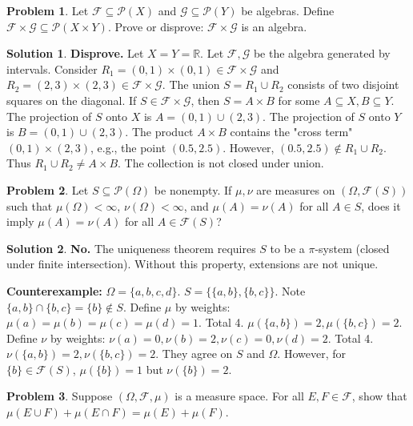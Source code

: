\documentclass[11pt]{article}
\theoremstyle{definition}
\newtheorem{problem}{Problem}
\newtheorem*{solution}{Solution}
\newcommand{\R}{\mathbb{R}}
\newcommand{\F}{\mathcal{F}}
\newcommand{\G}{\mathcal{G}}
\newcommand{\Pset}{\mathcal{P}}
\begin{document}
\hrulefill

\begin{problem}
Let $\F \subseteq \Pset(X)$ and $\G \subseteq \Pset(Y)$ be algebras. Define $\F \times \G \subseteq \Pset(X \times Y)$. Prove or disprove: $\F \times \G$ is an algebra.
\end{problem}

\begin{solution}
\textbf{Disprove.}
Let $X = Y = \R$. Let $\F, \G$ be the algebra generated by intervals.
Consider $R_1 = (0, 1) \times (0, 1) \in \F \times \G$ and $R_2 = (2, 3) \times (2, 3) \in \F \times \G$.
The union $S = R_1 \cup R_2$ consists of two disjoint squares on the diagonal.
If $S \in \F \times \G$, then $S = A \times B$ for some $A \subseteq X, B \subseteq Y$.
The projection of $S$ onto $X$ is $A = (0, 1) \cup (2, 3)$.
The projection of $S$ onto $Y$ is $B = (0, 1) \cup (2, 3)$.
The product $A \times B$ contains the "cross term" $(0, 1) \times (2, 3)$, e.g., the point $(0.5, 2.5)$.
However, $(0.5, 2.5) \notin R_1 \cup R_2$.
Thus $R_1 \cup R_2 \neq A \times B$. The collection is not closed under union.
\end{solution}

\hrulefill

\begin{problem}
Let $S \subseteq \Pset(\Omega)$ be nonempty. If $\mu, \nu$ are measures on $(\Omega, \F(S))$ such that $\mu(\Omega) < \infty$, $\nu(\Omega) < \infty$, and $\mu(A) = \nu(A)$ for all $A \in S$, does it imply $\mu(A) = \nu(A)$ for all $A \in \F(S)$?
\end{problem}

\begin{solution}
\textbf{No.} The uniqueness theorem requires $S$ to be a $\pi$-system (closed under finite intersection). Without this property, extensions are not unique.

\textbf{Counterexample:}
$\Omega = \{a, b, c, d\}$.
$S = \{\{a, b\}, \{b, c\}\}$. Note $\{a, b\} \cap \{b, c\} = \{b\} \notin S$.
Define $\mu$ by weights: $\mu(a)=\mu(b)=\mu(c)=\mu(d)=1$. Total 4.
$\mu(\{a, b\}) = 2, \mu(\{b, c\}) = 2$.
Define $\nu$ by weights: $\nu(a)=0, \nu(b)=2, \nu(c)=0, \nu(d)=2$. Total 4.
$\nu(\{a, b\}) = 2, \nu(\{b, c\}) = 2$.
They agree on $S$ and $\Omega$.
However, for $\{b\} \in \F(S)$, $\mu(\{b\}) = 1$ but $\nu(\{b\}) = 2$.
\end{solution}

\hrulefill

\begin{problem}
Suppose $(\Omega, \F, \mu)$ is a measure space. For all $E, F \in \F$, show that $\mu(E \cup F) + \mu(E \cap F) = \mu(E) + \mu(F)$.
\end{problem}
\end{document}
